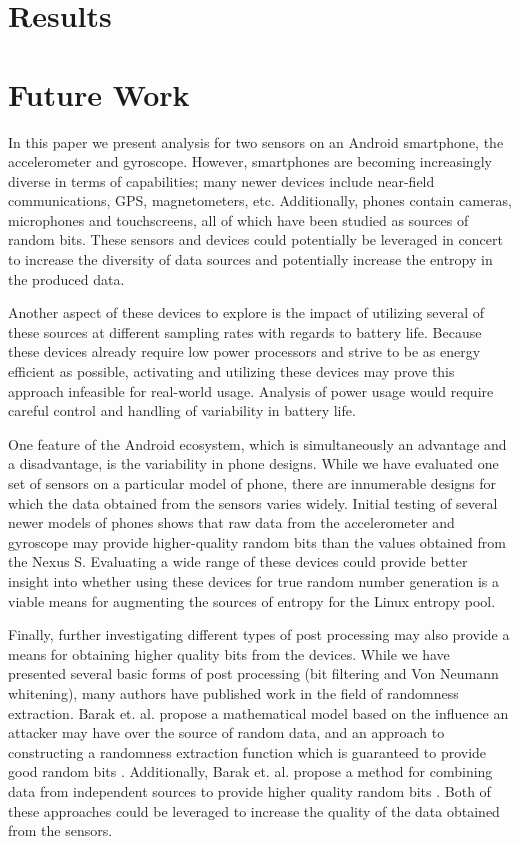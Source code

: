 \documentclass[conference]{IEEEtran}
\begin{document}
\section{Results}

\section{Future Work}
In this paper we present analysis for two sensors on an Android smartphone,
the accelerometer and gyroscope.  However, smartphones are becoming
increasingly diverse in terms of capabilities; many newer devices include
near-field communications, GPS, magnetometers, etc.  Additionally, phones
contain cameras, microphones and touchscreens, all of which have been studied
as sources of random bits.  These sensors and devices could potentially be
leveraged in concert to increase the diversity of data sources and potentially
increase the entropy in the produced data.

Another aspect of these devices to explore is the impact of utilizing several
of these sources at different sampling rates with regards to battery life.
Because these devices already require low power processors and strive to be
as energy efficient as possible, activating and utilizing these devices may
prove this approach infeasible for real-world usage.  Analysis of power usage
would require careful control and handling of variability in battery life.

One feature of the Android ecosystem, which is simultaneously an advantage and
a disadvantage, is the variability in phone designs.  While we have evaluated
one set of sensors on a particular model of phone, there are
innumerable designs for which the data obtained from the sensors varies widely.
Initial testing of several newer models of phones shows that raw data from the
accelerometer and gyroscope may provide higher-quality random bits than
the values obtained from the Nexus S.  Evaluating a wide range of these devices
could provide better insight into whether using these devices for true random
number generation is a viable means for augmenting the sources of entropy for
the Linux entropy pool.

Finally, further investigating different types of post processing may also provide a
means for obtaining higher quality bits from the devices.  While we have
presented several basic forms of post processing (bit filtering and Von Neumann
whitening), many authors have published work in the field of randomness
extraction.  Barak et. al. propose a mathematical model based on the influence
an attacker may have over the source of random data, and an approach to
constructing a randomness extraction function which is guaranteed to provide
good random bits \cite{true_rng_changing_environments}.  Additionally, Barak
et. al. propose a method for combining data from independent sources to
provide higher quality random bits \cite{independent_sources}.  Both of these
approaches could be leveraged to increase the quality of the data obtained
from the sensors.
\end{document}
